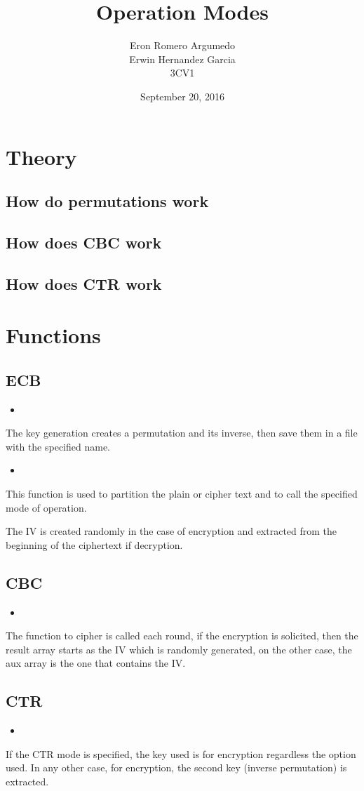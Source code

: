 \documentclass[titlepage, 12pt]{article}
\title{Operation Modes}
\author{Eron Romero Argumedo\\Erwin Hernandez Garcia\\3CV1}
\date{September 20, 2016}
\numberwithin{equation}{section}%
\numberwithin{figure}{section}%
\numberwithin{table}{section}%
\newcommand{\delimitCodeScript}[6][]{
	\begin{itemize}
		\item[]
	\end{itemize}	
}
\begin{document}
	\maketitle
	\tableofcontents
	\listoffigures
	\listoftables
	\newpage
	\section{Theory}
		\subsection{How do permutations work}
		\subsection{How does CBC work}
		\subsection{How does CTR work}
	\section{Functions}
		\subsection{ECB}
		\delimitCodeScript{cpp}{Functions}{Key generation}{18}{30}
		The key generation creates a permutation and its inverse, then save them in a file with the specified name.
		\delimitCodeScript{cpp}{Functions}{Main function}{40}{91}
		This function is used to partition the plain or cipher text and to call the specified mode of operation.
		
		The IV is created randomly in the case of encryption and extracted from the beginning of the ciphertext if decryption.
		\subsection{CBC}
		\delimitCodeScript{cpp}{Functions}{CBC operation mode}{93}{106}
		The function to cipher is called each round, if the encryption is solicited, then the result array starts as the IV which is randomly generated, on the other case, the aux array is the one that contains the IV.
		\subsection{CTR}
		\delimitCodeScript{cpp}{Functions}{CTR operation mode}{108}{113}
		If the CTR mode is specified, the key used is for encryption regardless the option used. In any other case, for encryption, the second key (inverse permutation) is extracted.
	
	
\end{document}
